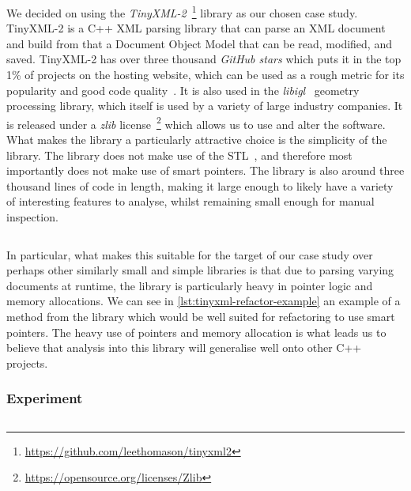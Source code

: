 \documentclass{mpaper}
\begin{document}
    We decided on using the \emph{TinyXML-2}~\footnote{\url{https://github.com/leethomason/tinyxml2}} library as our chosen case study.
    TinyXML-2 is a C++ XML parsing library that can parse an XML document and build from that a Document Object Model that can be read, modified, and saved.
    TinyXML-2 has over three thousand \emph{GitHub stars} which puts it in the top 1\% of projects on the hosting website, which can be used as a rough metric for its popularity and good code quality~\cite{Sanatinia2016}.
    It is also used in the \emph{libigl}~\cite{Libigl} geometry processing library,  which itself is used by a variety of large industry companies.
    It is released under a \emph{zlib} license~\footnote{\url{https://opensource.org/licenses/Zlib}} which allows us to use and alter the software.
    What makes the library a particularly attractive choice is the simplicity of the library.
    The library does not make use of the STL~\cite{C++17}, and therefore most importantly does not make use of smart pointers. 
    The library is also around three thousand lines of code in length, making it large enough to likely have a variety of interesting features to analyse, whilst remaining small enough for manual inspection.
    
    \begin{listing}
        \inputminted{cpp}{code/tinyxml2-example.cpp}
        \caption{Example of a method in the TinyXML-2 library which could be refactored to use smart pointers as it returns an owning pointer to a newly created object.}
        \label{lst:tinyxml-refactor-example}
    \end{listing}
    
    In particular, what makes this suitable for the target of our case study over perhaps other similarly small and simple libraries is that due to parsing varying documents at runtime, the library is particularly heavy in pointer logic and memory allocations.
    We can see in \autoref{lst:tinyxml-refactor-example} an example of a method from the library which would be well suited for refactoring to use smart pointers.
    The heavy use of pointers and memory allocation is what leads us to believe that analysis into this library will generalise well onto other C++ projects.
    
    \subsubsection{Experiment}
    
    \begin{listing}
        \inputminted{json}{code/compile_commands.json}
        \caption{Compilation Database for TinyXML-2}
        \label{lst:tinyxml-compilation-database}
    \end{listing}
    
\end{document}
